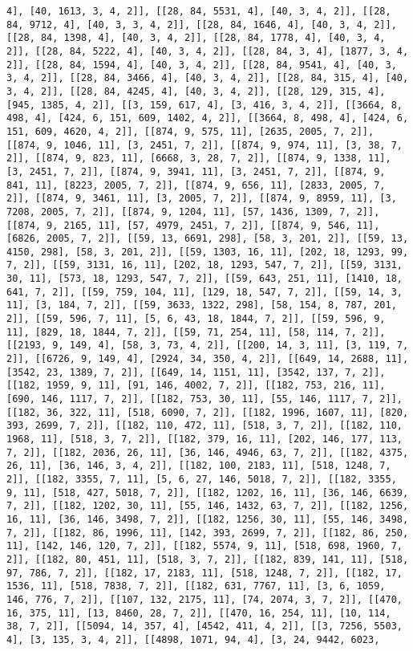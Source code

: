 \documentclass[12pt,fleqn]{article}\usepackage{../../common}
\begin{document}
\begin{verbatim}
4], [40, 1613, 3, 4, 2]], [[28, 84, 5531, 4], [40, 3, 4, 2]], [[28, 84, 9712, 4], [40, 3, 3, 4, 2]], [[28, 84, 1646, 4], [40, 3, 4, 2]], [[28, 84, 1398, 4], [40, 3, 4, 2]], [[28, 84, 1778, 4], [40, 3, 4, 2]], [[28, 84, 5222, 4], [40, 3, 4, 2]], [[28, 84, 3, 4], [1877, 3, 4, 2]], [[28, 84, 1594, 4], [40, 3, 4, 2]], [[28, 84, 9541, 4], [40, 3, 3, 4, 2]], [[28, 84, 3466, 4], [40, 3, 4, 2]], [[28, 84, 315, 4], [40, 3, 4, 2]], [[28, 84, 4245, 4], [40, 3, 4, 2]], [[28, 129, 315, 4], [945, 1385, 4, 2]], [[3, 159, 617, 4], [3, 416, 3, 4, 2]], [[3664, 8, 498, 4], [424, 6, 151, 609, 1402, 4, 2]], [[3664, 8, 498, 4], [424, 6, 151, 609, 4620, 4, 2]], [[874, 9, 575, 11], [2635, 2005, 7, 2]], [[874, 9, 1046, 11], [3, 2451, 7, 2]], [[874, 9, 974, 11], [3, 38, 7, 2]], [[874, 9, 823, 11], [6668, 3, 28, 7, 2]], [[874, 9, 1338, 11], [3, 2451, 7, 2]], [[874, 9, 3941, 11], [3, 2451, 7, 2]], [[874, 9, 841, 11], [8223, 2005, 7, 2]], [[874, 9, 656, 11], [2833, 2005, 7, 2]], [[874, 9, 3461, 11], [3, 2005, 7, 2]], [[874, 9, 8959, 11], [3, 7208, 2005, 7, 2]], [[874, 9, 1204, 11], [57, 1436, 1309, 7, 2]], [[874, 9, 2165, 11], [57, 4979, 2451, 7, 2]], [[874, 9, 546, 11], [6826, 2005, 7, 2]], [[59, 13, 6691, 298], [58, 3, 201, 2]], [[59, 13, 4150, 298], [58, 3, 201, 2]], [[59, 1303, 16, 11], [202, 18, 1293, 99, 7, 2]], [[59, 3131, 16, 11], [202, 18, 1293, 547, 7, 2]], [[59, 3131, 30, 11], [573, 18, 1293, 547, 7, 2]], [[59, 643, 251, 11], [1410, 18, 641, 7, 2]], [[59, 759, 104, 11], [129, 18, 547, 7, 2]], [[59, 14, 3, 11], [3, 184, 7, 2]], [[59, 3633, 1322, 298], [58, 154, 8, 787, 201, 2]], [[59, 596, 7, 11], [5, 6, 43, 18, 1844, 7, 2]], [[59, 596, 9, 11], [829, 18, 1844, 7, 2]], [[59, 71, 254, 11], [58, 114, 7, 2]], [[2193, 9, 149, 4], [58, 3, 73, 4, 2]], [[200, 14, 3, 11], [3, 119, 7, 2]], [[6726, 9, 149, 4], [2924, 34, 350, 4, 2]], [[649, 14, 2688, 11], [3542, 23, 1389, 7, 2]], [[649, 14, 1151, 11], [3542, 137, 7, 2]], [[182, 1959, 9, 11], [91, 146, 4002, 7, 2]], [[182, 753, 216, 11], [690, 146, 1117, 7, 2]], [[182, 753, 30, 11], [55, 146, 1117, 7, 2]], [[182, 36, 322, 11], [518, 6090, 7, 2]], [[182, 1996, 1607, 11], [820, 393, 2699, 7, 2]], [[182, 110, 472, 11], [518, 3, 7, 2]], [[182, 110, 1968, 11], [518, 3, 7, 2]], [[182, 379, 16, 11], [202, 146, 177, 113, 7, 2]], [[182, 2036, 26, 11], [36, 146, 4946, 63, 7, 2]], [[182, 4375, 26, 11], [36, 146, 3, 4, 2]], [[182, 100, 2183, 11], [518, 1248, 7, 2]], [[182, 3355, 7, 11], [5, 6, 27, 146, 5018, 7, 2]], [[182, 3355, 9, 11], [518, 427, 5018, 7, 2]], [[182, 1202, 16, 11], [36, 146, 6639, 7, 2]], [[182, 1202, 30, 11], [55, 146, 1432, 63, 7, 2]], [[182, 1256, 16, 11], [36, 146, 3498, 7, 2]], [[182, 1256, 30, 11], [55, 146, 3498, 7, 2]], [[182, 86, 1996, 11], [142, 393, 2699, 7, 2]], [[182, 86, 250, 11], [142, 146, 120, 7, 2]], [[182, 5574, 9, 11], [518, 698, 1960, 7, 2]], [[182, 80, 451, 11], [518, 3, 7, 2]], [[182, 839, 141, 11], [518, 97, 786, 7, 2]], [[182, 17, 2183, 11], [518, 1248, 7, 2]], [[182, 17, 1536, 11], [518, 7838, 7, 2]], [[182, 631, 7767, 11], [3, 6, 1059, 146, 776, 7, 2]], [[107, 132, 2175, 11], [74, 2074, 3, 7, 2]], [[470, 16, 375, 11], [13, 8460, 28, 7, 2]], [[470, 16, 254, 11], [10, 114, 38, 7, 2]], [[5094, 14, 357, 4], [4542, 411, 4, 2]], [[3, 7256, 5503, 4], [3, 135, 3, 4, 2]], [[4898, 1071, 94, 4], [3, 24, 9442, 6023, 
\end{verbatim}
\end{document}
